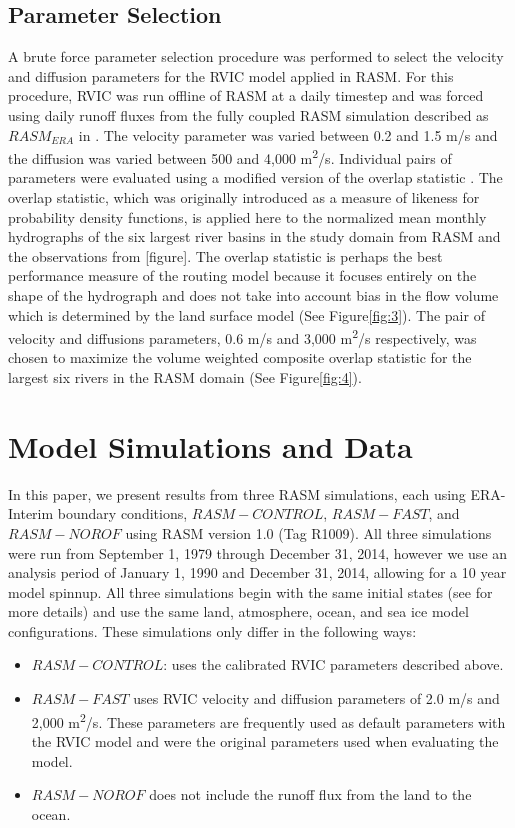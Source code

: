 \documentclass[jgrga, draft]{agutex}
\begin{document}
\begin{article}
\subsection{Parameter Selection}
\label{sec:parameters}

A brute force parameter selection procedure was performed to select the velocity and diffusion parameters for the RVIC model applied in RASM.
For this procedure, RVIC was run offline of RASM at a daily timestep and was forced using daily runoff fluxes from the fully coupled RASM simulation described as $RASM_{ERA}$ in \citep{Hamman_2015}.
The velocity parameter was varied between 0.2 and 1.5 m/s and the diffusion was varied between 500 and 4,000 m\textsuperscript{2}/s.
Individual pairs of parameters were evaluated using a modified version of the overlap statistic \citet{Perkins_2012}.
The overlap statistic, which was originally introduced as a measure of likeness for probability density functions, is applied here to the normalized mean monthly hydrographs of the six largest river basins in the study domain from RASM and the observations from \citet{Dai_2009} [figure].
The overlap statistic is perhaps the best performance measure of the routing model because it focuses entirely on the shape of the hydrograph and does not take into account bias in the flow volume which is determined by the land surface model (See Figure\ref{fig:3}).
The pair of velocity and diffusions parameters, 0.6 m/s and 3,000 m\textsuperscript{2}/s respectively, was chosen to maximize the volume weighted composite overlap statistic for the largest six rivers in the RASM domain (See Figure\ref{fig:4}).

\section{Model Simulations and Data}

In this paper, we present results from three RASM simulations, each using ERA-Interim boundary conditions, $RASM-CONTROL$, $RASM-FAST$, and $RASM-NOROF$ using RASM version 1.0 (Tag R1009).
All three simulations were run from September 1, 1979 through December 31, 2014, however we use an analysis period of January 1, 1990 and December 31, 2014, allowing for a 10 year model spinnup.
All three simulations begin with the same initial states (see \citet{Hamman_2015} for more details) and use the same land, atmosphere, ocean, and sea ice model configurations.
These simulations only differ in the following ways:
\begin{itemize}
\item $RASM-CONTROL$: uses the calibrated RVIC parameters described above.
\item $RASM-FAST$ uses RVIC velocity and diffusion parameters of 2.0 m/s and 2,000 m\textsuperscript{2}/s. These parameters are frequently used as default parameters with the RVIC model and were the original parameters used when evaluating the model.
\item $RASM-NOROF$ does not include the runoff flux from the land to the ocean.
\end{itemize}


\end{article}
\end{document}
